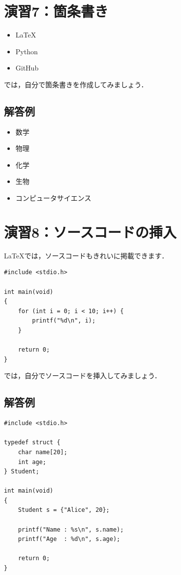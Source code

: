 \documentclass[a4paper,twocolumn]{jsarticle}
\begin{document}
\section*{演習7：箇条書き}
\begin{itemize}
    \item LaTeX
    \item Python
    \item GitHub
\end{itemize}

では，自分で箇条書きを作成してみましょう．

\subsection*{解答例}
\begin{itemize}
    \item 数学
    \item 物理
    \item 化学
    \item 生物
    \item コンピュータサイエンス
\end{itemize}

\section*{演習8：ソースコードの挿入}
LaTeXでは，ソースコードもきれいに掲載できます．

\begin{lstlisting}
#include <stdio.h>

int main(void)
{
    for (int i = 0; i < 10; i++) {
        printf("%d\n", i);
    }

    return 0;
}
\end{lstlisting}

では，自分でソースコードを挿入してみましょう．

\subsection*{解答例}
\begin{lstlisting}
#include <stdio.h>

typedef struct {
    char name[20];
    int age;
} Student;

int main(void)
{
    Student s = {"Alice", 20};

    printf("Name : %s\n", s.name);
    printf("Age  : %d\n", s.age);

    return 0;
}
\end{lstlisting}
\end{document}
